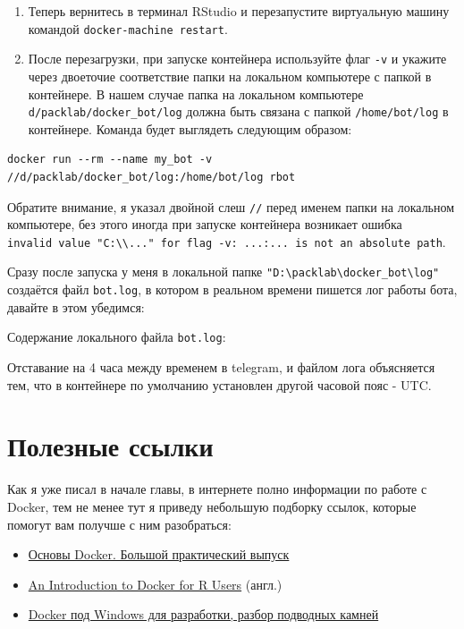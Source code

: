 \documentclass[
]{book}
\providecommand{\tightlist}{%
  \setlength{\itemsep}{0pt}\setlength{\parskip}{0pt}}
\begin{document}
\begin{enumerate}
\def\labelenumi{\arabic{enumi}.}
\setcounter{enumi}{3}
\item
  Теперь вернитесь в терминал RStudio и перезапустите виртуальную машину командой \texttt{docker-machine\ restart}.
\item
  После перезагрузки, при запуске контейнера используйте флаг \texttt{-v} и укажите через двоеточие соответствие папки на локальном компьютере с папкой в контейнере. В нашем случае папка на локальном компьютере \texttt{d/packlab/docker\_bot/log} должна быть связана с папкой \texttt{/home/bot/log} в контейнере. Команда будет выглядеть следующим образом:
\end{enumerate}

\begin{verbatim}
docker run --rm --name my_bot -v //d/packlab/docker_bot/log:/home/bot/log rbot
\end{verbatim}

Обратите внимание, я указал двойной слеш \texttt{//} перед именем папки на локальном компьютере, без этого иногда при запуске контейнера возникает ошибка \texttt{invalid\ value\ "C:\textbackslash{}\textbackslash{}..."\ for\ flag\ -v:\ ...:...\ is\ not\ an\ absolute\ path}.

Сразу после запуска у меня в локальной папке \texttt{"D:\textbackslash{}packlab\textbackslash{}docker\_bot\textbackslash{}log"} создаётся файл \texttt{bot.log}, в котором в реальном времени пишется лог работы бота, давайте в этом убедимся:

Содержание локального файла \texttt{bot.log}:

Отставание на 4 часа между временем в telegram, и файлом лога объясняется тем, что в контейнере по умолчанию установлен другой часовой пояс - UTC.

\section{Полезные ссылки}\label{ux43fux43eux43bux435ux437ux43dux44bux435-ux441ux441ux44bux43bux43aux438}

Как я уже писал в начале главы, в интернете полно информации по работе с Docker, тем не менее тут я приведу небольшую подборку ссылок, которые помогут вам получше с ним разобраться:

\begin{itemize}
\tightlist
\item
  \href{https://youtu.be/QF4ZF857m44}{Основы Docker. Большой практический выпуск}
\item
  \href{https://colinfay.me/docker-r-reproducibility/}{An Introduction to Docker for R Users} (англ.)
\item
  \href{https://habr.com/ru/post/358774/}{Docker под Windows для разработки, разбор подводных камней}
\end{itemize}
\end{document}
